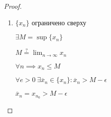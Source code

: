 \begin{proof}
    \begin{enumerate}
    \item
        $\{x_n\}$ ограничено сверху

        $\exists M = \sup \{x_n\}$

        $M \overset{?}{=} \lim_{n \to \infty} x_n$

        $\forall n \implies x_n \leq M$

        $\forall e > 0 \ \exists \overline{x}_n \in \{x_n\} : \overline{x}_n > M - \epsilon$
        
        $\overline{x}_n = x_{n_0} > M - \epsilon$
    \end{enumerate}
\end{proof}

